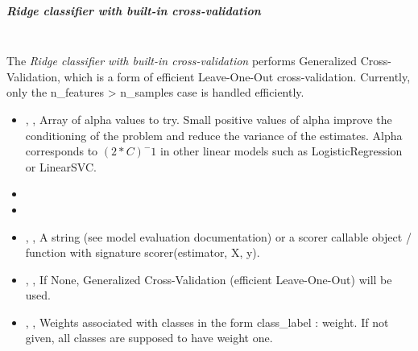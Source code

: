 \subparagraph{Ridge classifier with built-in cross-validation}
\mbox{}
\\The \textit{Ridge classifier with built-in cross-validation} performs
Generalized Cross-Validation, which is a form of efficient Leave-One-Out
cross-validation.
%
Currently, only the n\_features > n\_samples case is
handled efficiently.
%
\begin{itemize}
  \item {} , ,
  Array of alpha values to try.
  Small positive values of alpha improve the conditioning of the problem and
  reduce the variance of the estimates.
  Alpha corresponds to $(2*C)^-1$ in other linear models such as
  LogisticRegression or LinearSVC.
  \item {}
  \item {}
  \item {} , ,
  A string (see model evaluation documentation) or a scorer callable object /
  function with signature scorer(estimator, X, y).
  \item {} , ,
  If None, Generalized Cross-Validation (efficient Leave-One-Out) will be used.
  \item {} , ,
  Weights associated with classes in the form {class\_label :
    weight}.
  If not given, all classes are supposed to have weight one.
\end{itemize}

